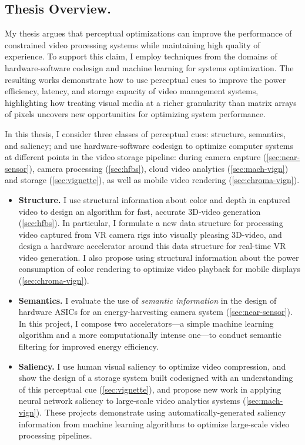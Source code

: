 \subsection{Thesis Overview.} My thesis argues that perceptual optimizations can improve the performance of constrained video processing systems while maintaining high quality of experience.
To support this claim, I employ techniques from the domains of hardware-software codesign and machine learning for systems optimization.
The resulting works demonstrate how to use perceptual cues to improve the power efficiency, latency, and storage capacity of video management systems, highlighting how treating visual media at a richer granularity than matrix arrays of pixels uncovers new opportunities for optimizing system performance.

In this thesis, I consider three classes of perceptual cues: structure, semantics, and saliency; and use hardware-software codesign to optimize computer systems at different points in the video storage pipeline: during camera capture (\ref{sec:near-sensor}), camera processing (\ref{sec:hfbs}), cloud video analytics (\ref{sec:mach-vign}) and storage (\ref{sec:vignette}), as well as mobile video rendering (\ref{sec:chroma-vign}).

\begin{itemize}
\item \textbf{Structure.} I use structural information about color and depth in captured video to design an algorithm for fast, accurate 3D-\threesixty video generation (\ref{sec:hfbs}).
In particular, I formulate a new data structure for processing video captured from VR camera rigs into visually pleasing 3D-\threesixty video, and design a hardware accelerator around this data structure for real-time VR video generation.
I also propose using structural information about the power consumption of color rendering to optimize video playback for mobile displays (\ref{sec:chroma-vign}).

\item \textbf{Semantics.} I evaluate the use of \emph{semantic information} in the design of hardware ASICs for an energy-harvesting camera system (\ref{sec:near-sensor}).
In this project, I compose two accelerators---a simple machine learning algorithm and a more computationally intense one---to conduct semantic filtering for improved energy efficiency.

\item \textbf{Saliency.} I use human visual saliency to optimize video compression, and show the design of a storage system built codesigned with an understanding of this perceptual cue (\ref{sec:vignette}), and propose new work in applying neural network saliency to large-scale video analytics systems (\ref{sec:mach-vign}).
These projects demonstrate using automatically-generated saliency information from machine learning algorithms to optimize large-scale video processing pipelines.
\end{itemize}

